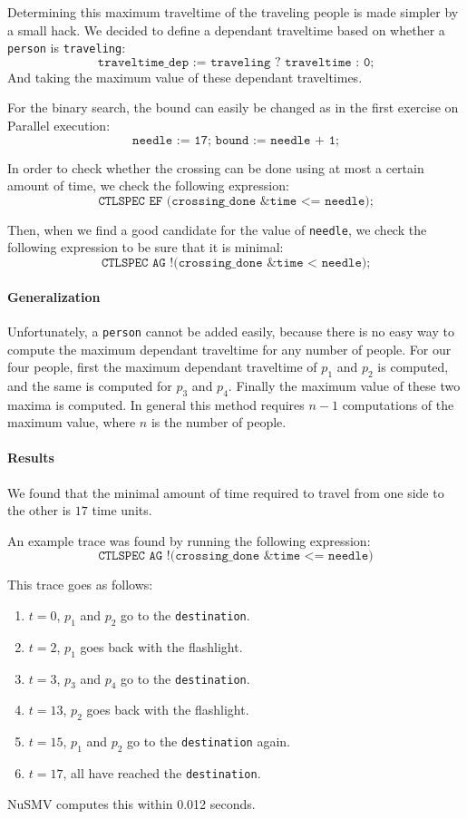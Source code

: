 \documentclass[12pt]{article}
\begin{document}
Determining this maximum traveltime of the traveling people is made simpler by a small hack.
We decided to define a dependant traveltime based on whether a \texttt{person} is \texttt{traveling}:
\[ \texttt{traveltime\_dep := traveling ? traveltime : 0;} \]
And taking the maximum value of these dependant traveltimes.

For the binary search, the bound can easily be changed as in the first exercise on Parallel execution:
\[\texttt{needle := 17; bound := needle + 1;}\]

In order to check whether the crossing can be done using at most a certain amount of time, we check the following expression:
\[ \texttt{CTLSPEC EF (crossing\_done \& time <= needle);} \]

Then, when we find a good candidate for the value of \texttt{needle}, we check the following expression to be sure that it is minimal:
\[ \texttt{CTLSPEC AG !(crossing\_done \& time < needle);} \]

\paragraph{Generalization}
Unfortunately, a \texttt{person} cannot be added easily, because there is no easy way to compute the maximum dependant traveltime for any number of people.
For our four people, first the maximum dependant traveltime of $p_1$ and $p_2$ is computed, and the same is computed for $p_3$ and $p_4$.
Finally the maximum value of these two maxima is computed.
In general this method requires $n-1$ computations of the maximum value, where $n$ is the number of people.

\paragraph{Results}
We found that the minimal amount of time required to travel from one side to the other is $17$ time units.

An example trace was found by running the following expression:
\[ \texttt{CTLSPEC AG !(crossing\_done \& time <= needle)} \]

This trace goes as follows:
\begin{enumerate}
\item $t = 0$, $p_1$ and $p_2$ go to the \texttt{destination}.
\item $t = 2$, $p_1$ goes back with the flashlight.
\item $t = 3$, $p_3$ and $p_4$ go to the \texttt{destination}.
\item $t = 13$, $p_2$ goes back with the flashlight.
\item $t = 15$, $p_1$ and $p_2$ go to the \texttt{destination} again.
\item $t = 17$, all have reached the \texttt{destination}.
\end{enumerate}

NuSMV computes this within 0.012 seconds.

{}

\end{document}
